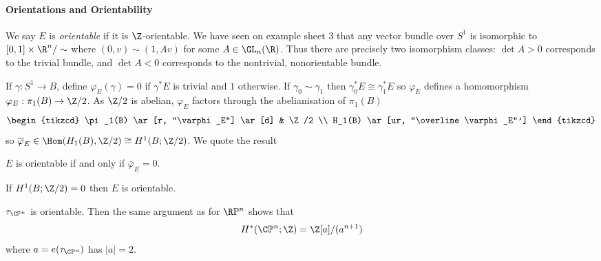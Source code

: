 \documentclass[a4paper]{article}
\renewcommand*{\P}{\mathbb{P}}
\begin{document}
\paragraph{Orientations and Orientability}

We say \(E\) is \emph{orientable} if it is \(\Z\)-orientable. We have seen on example sheet 3 that any vector bundle over \(S^1\) is isomorphic to \([0, 1] \times \R^n/\sim\) where \((0, v) \sim (1, A v)\) for some \(A \in \GL_n(\R)\). Thus there are precisely two isomorphism classes: \(\det A > 0\) corresponds to the trivial bundle, and \(\det A < 0\) corresponds to the nontrivial, nonorientable bundle.

If \(\gamma: S^1 \to B\), define \(\varphi_E(\gamma) = 0\) if \(\gamma^*E\) is trivial and \(1\) otherwise. If \(\gamma_0 \sim \gamma_1\) then \(\gamma_0^* E \cong \gamma_1^* E\) so \(\varphi_E\) defines a homomorphism \(\varphi_E: \pi_1(B) \to \Z/2\). As \(\Z/2\) is abelian, \(\varphi_E\) factors through the abelianisation of \(\pi_1(B)\)
\[
  \begin{tikzcd}
    \pi_1(B) \ar[r, "\varphi_E"] \ar[d] & \Z/2 \\
    H_1(B) \ar[ur, "\overline \varphi_E"']
  \end{tikzcd}
\]
so \(\overline \varphi_E \in \Hom(H_1(B), \Z/2) \cong H^1(B; \Z/2)\). We quote the result

\begin{theorem}
  \(E\) is orientable if and only if \(\overline \varphi_E = 0\).
\end{theorem}

\begin{corollary}
  If \(H^1(B; \Z/2) = 0\) then \(E\) is orientable.
\end{corollary}

\begin{eg}
  \(\tau_{\C\P^n}\) is orientable. Then the same argument as for \(\R\P^n\) shows that
  \[
    H^*(\C\P^n; \Z) = \Z[a]/(a^{n + 1})
  \]
  where \(a = e(\tau_{\C\P^n})\) has \(|a| = 2\).
\end{eg}








\printindex
\end{document}
